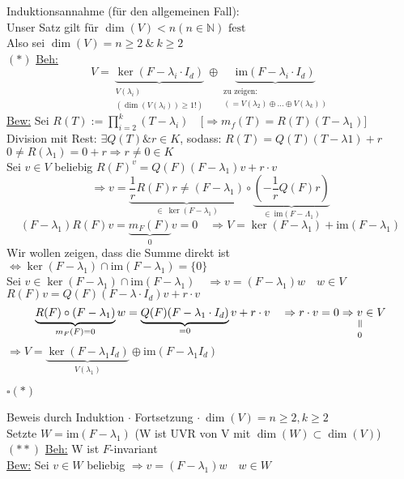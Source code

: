 \documentclass[titlepage,12pt,a4paper,ngerman]{report}
\newcommand{\verteq}{\rotatebox{90}{$\,=$}}
\newcommand{\equalto}[2]{\underset{\scriptstyle\overset{\mkern4mu\verteq}{#2}}{#1}}
\newcommand{\tx}[1]{\textrm{#1}}
\newcommand{\ub}[1]{\underbrace{#1}}
\newcommand{\im}{\tx{im}}
\begin{document}
Induktionsannahme (für den allgemeinen Fall): \\
Unser Satz gilt für $ \dim(V) < n (n\in \mathbb{N}) \tx{ fest} $\\
Also sei $ \dim(V) = n \ge 2 \ \&\  k \ge 2 $ \\
$(*)$ \underline{Beh:} \\	
$$ V = \ub{\ker(F-\lambda_i \cdot I_d)}_{\substack{V(\lambda_i)  \\ (\dim(V(\lambda_i)) \ge 1 !)}} \oplus \ub{\im(F-\lambda_i \cdot I_d)}_{\substack{\tx{zu zeigen:} \\ (= V(\lambda_2) \oplus \dots \oplus V(\lambda_k))}} $$
\underline{Bew:} Sei $ R(T) := \prod_{i=2}^{k}(T-\lambda_i) \quad \Big[ \Rightarrow m_f(T) = R(T) (T-\lambda_1)\Big] $\\
Division mit Rest: $ \exists Q(T) \& r\in K $, sodass:
$R(T) = Q(T) (T-\lambda1) + r $\\
$0 \neq R(\lambda_1) = 0 + r \Rightarrow r \neq 0 \in K$\\
Sei $ v\in V $ beliebig $ R(F)^v = Q(F) (F-\lambda_1) v + r \cdot v $\\
$$\Rightarrow v = \ub{\frac{1}{r} R(F) r \neq (F-\lambda_1) }_{\in \ \ker(F-\lambda_1)} \circ \ub{(-\frac{1}{r} Q(F) r)}_{\in \ \im(F-\Lambda_1)} $$
$$(F-\lambda_1) R(F)v = \ub{m_F(F)}_{0}v = 0 \quad \Rightarrow V = \ker(F-\lambda_1) + \im(F-\lambda_1)$$
Wir wollen zeigen, dass die Summe direkt ist $ \Leftrightarrow  \ker(F-\lambda_1) \cap \im(F-\lambda_1) = \{0\}$\\
Sei $ v \in \ker(F-\lambda_1) \cap \im(F-\lambda_1) \quad \Rightarrow v = (F-\lambda_1)w \quad w\in V $\\
$R(F)v = Q(F) (F-\lambda\cdot I_d) v + r\cdot v $\\
$$\ub{R(F)\circ (F-\lambda_1)}_{m_F(F) = 0} w = \ub{Q(F)(F-\lambda_1 \cdot I_d)}_{= 0} v + r \cdot v \quad \Rightarrow r \cdot v = 0 \Rightarrow \equalto{v}{0} \in V$$
$\Rightarrow V = \ub{\ker(F-\lambda_1 I_d)}_{V(\lambda_1)} \oplus \im(F-\lambda_1 I_d ) $
\begin{flushright}
	$ \square (*)$
\end{flushright}
Beweis durch Induktion $ \cdot $ Fortsetzung $ \cdot \ \dim(V) = n \ge 2 , k \ge 2$\\
Setzte $ W = \im(F-\lambda_1) $ (W ist UVR von V mit $ \dim(W) \subset \dim(V) $)\\
$(**)$ \underline{Beh:} W ist $ F $-invariant\\
\underline{Bew:} Sei $ v\in W $ beliebig $ \Rightarrow v = (F-\lambda_1) w \quad w \in W$\\
\end{document}
